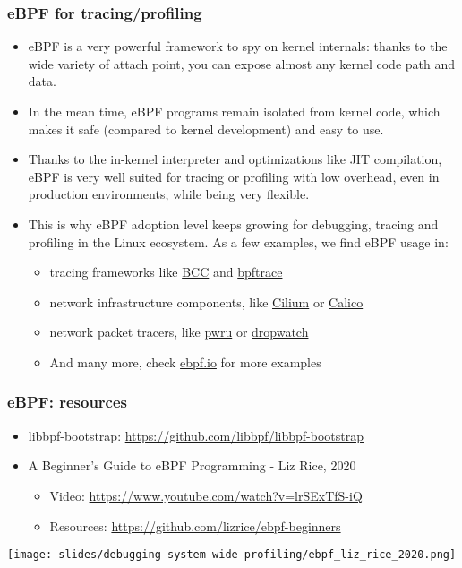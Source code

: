 \begin{frame}[fragile]
\frametitle{eBPF for tracing/profiling}
  \begin{itemize}
    \item eBPF is a very powerful framework to spy on kernel internals: thanks
    to the wide variety of attach point, you can expose almost any kernel code path and data.
    \item In the mean time, eBPF programs remain isolated from kernel code,
    which makes it safe (compared to kernel development) and easy to use.
    \item Thanks to the in-kernel interpreter and optimizations like JIT compilation, eBPF is very well
    suited for tracing or profiling with low overhead, even in production
    environments, while being very flexible.
    \item This is why eBPF adoption level keeps growing for debugging, tracing
    and profiling in the Linux ecosystem. As a few examples, we find eBPF usage in:
    \begin{itemize}
      \item tracing frameworks like \href{https://github.com/iovisor/bcc}{BCC}
      and \href{https://github.com/bpftrace/bpftrace}{bpftrace}
      \item network infrastructure components, like
      \href{https://github.com/cilium/cilium}{Cilium} or \href{https://github.com/projectcalico/calico}{Calico}
      \item network packet tracers, like
      \href{https://github.com/cilium/pwru}{pwru} or
      \href{https://github.com/feiskyer/dropwatch}{dropwatch}
      \item And many more, check \href{https://ebpf.io/applications/}{ebpf.io}
      for more examples
    \end{itemize}
  \end{itemize}
\end{frame}

\begin{frame}[fragile]
  \frametitle{eBPF: resources}
  \begin{itemize}
     \item libbpf-bootstrap: \url{https://github.com/libbpf/libbpf-bootstrap}
    \item A Beginner’s Guide to eBPF Programming - Liz Rice, 2020
    \begin{itemize}
      \item Video: \url{https://www.youtube.com/watch?v=lrSExTfS-iQ}
      \item Resources: \url{https://github.com/lizrice/ebpf-beginners}
    \end{itemize}
  \end{itemize}
  \begin{center}
     \texttt{[image: slides/debugging-system-wide-profiling/ebpf\_liz\_rice\_2020.png]}
  \end{center}
\end{frame}

